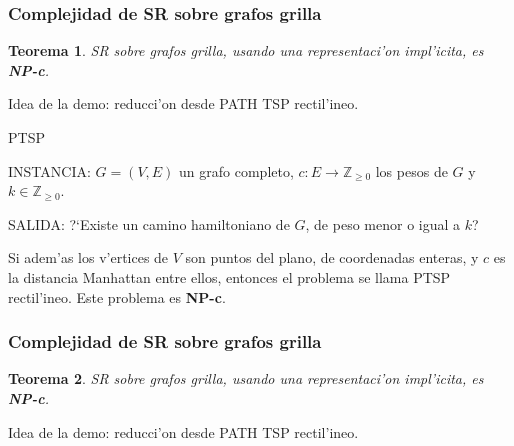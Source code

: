 \documentclass{beamer}
\newcommand{\class}[1]{\textnormal{\textbf{#1}}}
\newcommand{\probl}[1]{\textnormal{\textsf{#1}}}
\newtheorem*{thm}{Teorema}
\newcommand{\decpr}[3]{
\begin{list}{}{
\setlength{\leftmargin}{0.1in}
\setlength{\rightmargin}{0.1in}
\setlength{\parsep}{0pt}
\setlength{\itemsep}{2pt}
\setlength{\topsep}{\itemsep}
\setlength{\partopsep}{\itemsep}
}
\item
{\probl{#1}}
\item
{INSTANCIA: #2}
\item
{SALIDA: #3}
\end{list}
\vspace{1mm}
}
\begin{document}
\begin{frame}
\frametitle{Complejidad de \probl{SR} sobre grafos grilla}

\begin{thm}
\probl{SR} sobre grafos grilla, usando una representaci'on impl'icita, es \class{NP-c}.
\end{thm}

\vspace{3mm}

Idea de la demo: reducci'on desde \probl{PATH TSP} rectil'ineo.

\pause
\vspace{3mm}

\decpr{\probl{PTSP}}{$G = (V, E)$ un grafo completo, $c: E \to \mathbb{Z}_{\geq 0}$ los pesos de $G$ y $k \in \mathbb{Z}_{\geq 0}$.}{?`Existe un camino hamiltoniano de $G$, de peso menor o igual a $k$?}

\pause

Si adem'as los v'ertices de $V$ son puntos del plano, de coordenadas enteras, y $c$ es la distancia Manhattan entre ellos, entonces el problema se llama \probl{PTSP} rectil'ineo. Este problema es \class{NP-c}.

\end{frame}

\begin{frame}
\frametitle{Complejidad de \probl{SR} sobre grafos grilla}

\begin{thm}
\probl{SR} sobre grafos grilla, usando una representaci'on impl'icita, es \class{NP-c}.
\end{thm}

\vspace{3mm}

Idea de la demo: reducci'on desde \probl{PATH TSP} rectil'ineo.

\begin{figure}
	\begin{center}
		
	\end{center}	
\end{figure}

\end{frame}
\end{document}
